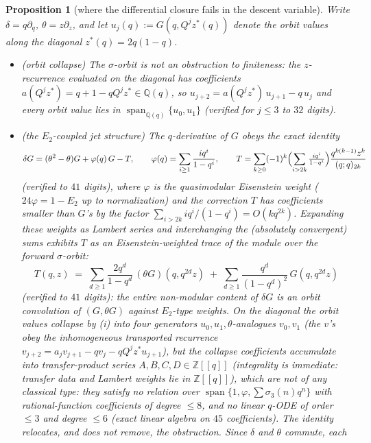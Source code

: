 \documentclass[11pt]{article}
\theoremstyle{plain}
\newtheorem{proposition}[theorem]{Proposition}
\theoremstyle{definition}
\theoremstyle{remark}
\newcommand{\Z}{\mathbb{Z}}
\newcommand{\Q}{\mathbb{Q}}
\begin{document}
\begin{proposition}[where the differential closure fails in the descent variable]
\label{prop:nofinitering}
Write $\delta=q\partial_q$, $\theta=z\partial_z$, and let $u_j(q):=G(q,Q^jz^\ast(q))$ denote the
orbit values along the diagonal $z^\ast(q)=2q(1-q)$.
\begin{itemize}
\item[\textup{(i)}] \textup{(orbit collapse)} The $\sigma$-orbit is \emph{not} an obstruction to
finiteness: the $z$-recurrence evaluated on the diagonal has coefficients
$a(Q^jz^\ast)=q+1-qQ^jz^\ast\in\Q(q)$, so $u_{j+2}=a(Q^jz^\ast)\,u_{j+1}-q\,u_j$ and every orbit
value lies in $\operatorname{span}_{\Q(q)}\{u_0,u_1\}$ \textup{(verified for $j\le3$ to $32$
digits)}.
\item[\textup{(ii)}] \textup{(the $E_2$-coupled jet structure)} The $q$-derivative of $G$ obeys the
exact identity
\[
   \delta G=(\theta^2-\theta)G+\varphi(q)\,G-T,\qquad
   \varphi(q)=\sum_{i\ge1}\frac{iq^i}{1-q^i},\qquad
   T=\sum_{k\ge0}(-1)^k\Bigl(\sum_{i>2k}\tfrac{iq^i}{1-q^i}\Bigr)\frac{q^{k(k-1)}z^k}{(q;q)_{2k}}
\]
\textup{(verified to $41$ digits)}, where $\varphi$ is the quasimodular Eisenstein weight
($24\varphi=1-E_2$ up to normalization) and the correction $T$ has coefficients smaller than $G$'s by
the factor $\sum_{i>2k}iq^i/(1-q^i)=O(kq^{2k})$. Expanding these weights as Lambert series and
interchanging the (absolutely convergent) sums exhibits $T$ as an Eisenstein-weighted trace of the
module over the forward $\sigma$-orbit:
\[
   T(q,z)\;=\;\sum_{d\ge1}\frac{2q^d}{1-q^d}\,(\theta G)(q,q^{2d}z)
   \;+\;\sum_{d\ge1}\frac{q^d}{(1-q^d)^2}\,G(q,q^{2d}z)
\]
\textup{(verified to $41$ digits)}: the entire non-modular content of $\delta G$ is an orbit
convolution of $(G,\theta G)$ against $E_2$-type weights. On the diagonal the orbit values collapse
by \textup{(i)} into four generators $u_0,u_1,\theta$-analogues $v_0,v_1$ (the $v$'s obey the
inhomogeneous transported recurrence $v_{j+2}=a_jv_{j+1}-qv_j-qQ^jz^\ast u_{j+1}$), but the collapse
coefficients accumulate into transfer-product series $A,B,C,D\in\Z[[q]]$ (integrality is immediate:
transfer data and Lambert weights lie in $\Z[[q]]$), which are \emph{not} of any classical type: they
satisfy no relation over $\operatorname{span}\{1,\varphi,\sum\sigma_3(n)q^n\}$ with rational-function
coefficients of degree $\le8$, and no linear $q$-ODE of order $\le3$ and degree $\le6$ (exact linear
algebra on $45$ coefficients). The identity relocates, and does not remove, the obstruction. Since $\delta$ and $\theta$ commute, each

\end{itemize}
\end{proposition}
\end{document}
